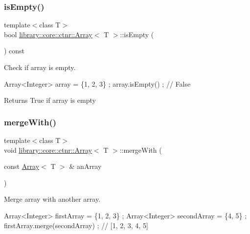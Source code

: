 \subsubsection{\texorpdfstring{is\+Empty()}{isEmpty()}}
{\footnotesize\ttfamily template$<$class T$>$ \\
bool \hyperlink{classlibrary_1_1core_1_1ctnr_1_1_array}{library\+::core\+::ctnr\+::\+Array}$<$ T $>$\+::is\+Empty (\begin{DoxyParamCaption}{ }\end{DoxyParamCaption}) const}



Check if array is empty. 


\begin{DoxyCode}
Array<Integer> array = \{1, 2, 3\} ;
array.isEmpty() ; \textcolor{comment}{// False}
\end{DoxyCode}


\begin{DoxyReturn}{Returns}
True if array is empty 
\end{DoxyReturn}
\mbox{\label{classlibrary_1_1core_1_1ctnr_1_1_array_abe72cec38e65761df3eaddcfa9b7a44a}} 
\subsubsection{\texorpdfstring{merge\+With()}{mergeWith()}}
{\footnotesize\ttfamily template$<$class T$>$ \\
void \hyperlink{classlibrary_1_1core_1_1ctnr_1_1_array}{library\+::core\+::ctnr\+::\+Array}$<$ T $>$\+::merge\+With (\begin{DoxyParamCaption}\item[{const \hyperlink{classlibrary_1_1core_1_1ctnr_1_1_array}{Array}$<$ T $>$ \&}]{an\+Array }\end{DoxyParamCaption})}



Merge array with another array. 


\begin{DoxyCode}
Array<Integer> firstArray = \{1, 2, 3\} ;
Array<Integer> secondArray = \{4, 5\} ;
firstArray.merge(secondArray) ; \textcolor{comment}{// [1, 2, 3, 4, 5]}
\end{DoxyCode}



